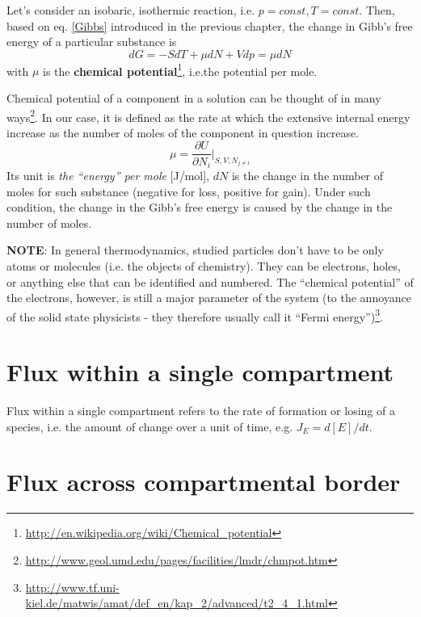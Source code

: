 Let's consider an isobaric, isothermic reaction, i.e. $p=const,
T=const$. Then, based on eq. \eqref{Gibbs} introduced in the previous
chapter, the change in Gibb's free energy of a particular substance is
\begin{equation}
  \label{eq:64}
  dG= -SdT + \mu dN + Vdp = \mu dN
\end{equation}
with $\mu$ is the
{\bf chemical
  potential}\footnote{\url{http://en.wikipedia.org/wiki/Chemical_potential}},
i.e.the potential per mole.


Chemical potential of a component in a solution can be thought of in
many
ways\footnote{\url{http://www.geol.umd.edu/pages/facilities/lmdr/chmpot.htm}}.
In our case, it is defined as the rate at which the extensive internal
energy increase as the number of moles of the component in question
increase.
\begin{equation}
  \label{eq:136}
  \mu = \frac{\partial U}{\partial N_i}|_{S,V,N_{j\neq i}} 
\end{equation}
Its unit is {\it the ``energy'' per mole} [J/mol], $dN$ is the change in
the number of moles for such substance (negative for loss,
positive for gain). Under such condition, the change in the Gibb's
free energy is caused by the change in the number of moles.

{\bf NOTE}: In general thermodynamics, studied particles don't have to
be only atoms or molecules (i.e. the objects of chemistry). They can
be electrons, holes, or anything else that can be identified and
numbered. The ``chemical potential'' of the electrons, however, is
still a major parameter of the system (to the annoyance of the solid
state physicists - they therefore usually call it ``Fermi
energy'')\footnote{\url{http://www.tf.uni-kiel.de/matwis/amat/def_en/kap_2/advanced/t2_4_1.html}}.



\section{Flux within a single compartment}
\label{sec:flux-within-compartments}

Flux within a single compartment refers to the rate of formation or losing of a
species, i.e. the amount of change over a unit of time, e.g. $J_E = d[E]/dt$.

\section{Flux across compartmental border}
\label{sec:flux-across-compartments}


